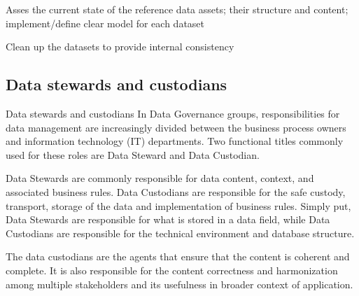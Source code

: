  Asses the current state of the reference data assets; their structure and content; implement/define clear model for each dataset 
 
 Clean up the datasets to provide internal consistency 
 
 \subsection{Data stewards and custodians}
 Data stewards and custodians
 In Data Governance groups, responsibilities for data management are increasingly divided between the business process owners and information technology (IT) departments. Two functional titles commonly used for these roles are Data Steward and Data Custodian.
 
 Data Stewards are commonly responsible for data content, context, and associated business rules. Data Custodians are responsible for the safe custody, transport, storage of the data and implementation of business rules. Simply put, Data Stewards are responsible for what is stored in a data field, while Data Custodians are responsible for the technical environment and database structure.
 
 The data custodians are the agents that ensure that the content is coherent and complete. It is also responsible for the content correctness and harmonization among multiple stakeholders and its usefulness in broader context of application.
 